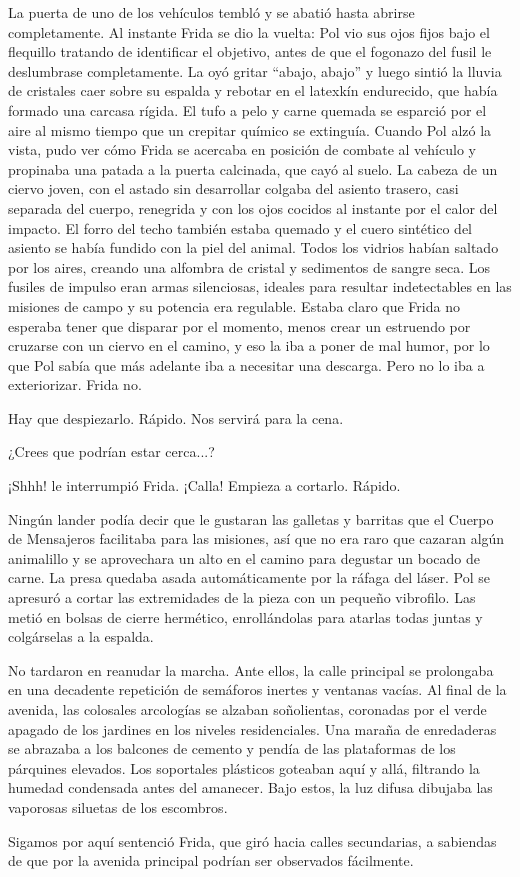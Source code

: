 La puerta de uno de los vehículos tembló y se abatió hasta abrirse completamente. Al instante Frida se dio la vuelta: Pol vio sus ojos fijos bajo el flequillo tratando de identificar el objetivo, antes de que el fogonazo del fusil le deslumbrase completamente. La oyó gritar “abajo, abajo” y luego sintió la lluvia de cristales caer sobre su espalda y rebotar en el latexkín endurecido, que había formado una carcasa rígida. El tufo a pelo y carne quemada se esparció por el aire al mismo tiempo que un crepitar químico se extinguía. Cuando Pol alzó la vista, pudo ver cómo Frida se acercaba en posición de combate al vehículo y propinaba una patada a la puerta calcinada, que cayó al suelo. La cabeza de un ciervo joven, con el astado sin desarrollar colgaba del asiento trasero, casi separada del cuerpo, renegrida y con los ojos cocidos al instante por el calor del impacto. El forro del techo también estaba quemado y el cuero sintético del asiento se había fundido con la piel del animal. Todos los vidrios habían saltado por los aires, creando una alfombra de cristal y sedimentos de sangre seca. Los fusiles de impulso eran armas silenciosas, ideales para resultar indetectables en las misiones de campo y su potencia era regulable. Estaba claro que Frida no esperaba tener que disparar por el momento, menos crear un estruendo por cruzarse con un ciervo en el camino, y eso la iba a poner de mal humor, por lo que Pol sabía que más adelante iba a necesitar una descarga. Pero no lo iba a exteriorizar. Frida no.

\reply Hay que despiezarlo. Rápido. Nos servirá para la cena.

\reply ¿Crees que podrían estar cerca...?

\reply ¡Shhh! \pause le interrumpió Frida\pauseend. ¡Calla! Empieza a cortarlo. Rápido.

Ningún lander podía decir que le gustaran las galletas y barritas que el Cuerpo de Mensajeros facilitaba para las misiones, así que no era raro que cazaran algún animalillo y se aprovechara un alto en el camino para degustar un bocado de  carne. La presa quedaba asada automáticamente por la ráfaga del láser. Pol se apresuró a cortar las extremidades de la pieza con un pequeño vibrofilo. Las metió en bolsas de cierre hermético, enrollándolas para atarlas todas juntas y colgárselas a la espalda. 

No tardaron en reanudar la marcha. Ante ellos, la calle principal se prolongaba en una decadente repetición de semáforos inertes y ventanas vacías. Al final de la avenida, las colosales arcologías se alzaban soñolientas, coronadas por el verde apagado de los jardines en los niveles residenciales. Una maraña de enredaderas se abrazaba a los balcones de cemento y pendía de las plataformas de los párquines elevados. Los soportales plásticos goteaban aquí y allá, filtrando la humedad condensada antes del amanecer. Bajo estos, la luz difusa dibujaba las vaporosas siluetas de los escombros. 

\reply Sigamos por aquí \pause sentenció Frida, que giró hacia calles secundarias, a sabiendas de que por la avenida principal podrían ser observados fácilmente.
